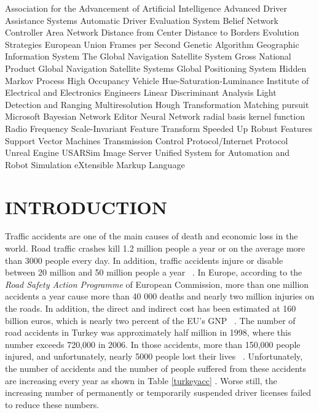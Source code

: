 \documentclass[a4paper,oneside,12pt]{report}
\begin{document}
\begin{symabbreviations}
 {Association for the Advancement of Artificial Intelligence}
 {Advanced Driver Assistance Systems} 
 {Automatic Driver Evaluation System} 
 {Belief Network}
 {Controller Area Network}
 {Distance from Center}
 {Distance to Borders}
 {Evolution Strategies}
 {European Union}
 {Frames per Second}
 {Genetic Algorithm}
 {Geographic Information System}
 {The Global Navigation Satellite System}
 {Gross National Product}
 {Global Navigation Satellite Systems}
 {Global Positioning System}
 {Hidden Markov Process}
 {High Occupancy Vehicle}
 {Hue-Saturation-Luminance}
 {Institute of Electrical and Electronics Engineers}
 {Linear Discriminant Analysis}
 {Light Detection and Ranging}
 {Multiresolution Hough Transformation}
 {Matching pursuit}
 {Microsoft Bayesian Network Editor}
 {Neural Network}
 {radial basis kernel function}
 {Radio Frequency}
 {Scale-Invariant Feature Transform}
 {Speeded Up Robust Features}
 {Support Vector Machines}
 {Transmission Control Protocol/Internet Protocol}
 {Unreal Engine}
 {USARSim Image Server}
 {Unified System for Automation and Robot Simulation}
 {eXtensible Markup Language}
\end{symabbreviations}

\chapter{INTRODUCTION}
Traffic accidents are one of the main causes of death and economic loss in the world. Road traffic crashes kill 1.2 million people a year or on the average more than 3000 people every day. In addition, traffic accidents injure or disable between 20 million and 50 million people a year ~\cite{peden_world_2004}. In Europe, according to the \textit{Road Safety Action Programme} of European Commission, more than one million accidents a year cause more than 40 000 deaths and nearly two million injuries on the roads. In addition, the direct and indirect cost has been estimated at 160 billion euros, which is nearly two percent of the EU's GNP ~\cite{eu_transport_01}. The number of road accidents in Turkey was approximately half million in 1998, where this number exceeds 720,000 in 2006. In those accidents, more than 150,000 people injured, and unfortunately, nearly 5000 people lost their lives ~\cite{sayistay_trafik_2008}. Unfortunately, the number of accidents and the number of people suffered from these accidents are increasing every year as shown in Table \ref{turkeyacc} \cite{sayistay_daimi_2010, sayistay_genel_2010}. Worse still, the increasing number of permanently or temporarily suspended driver licenses failed to reduce these numbers.
\end{document}
